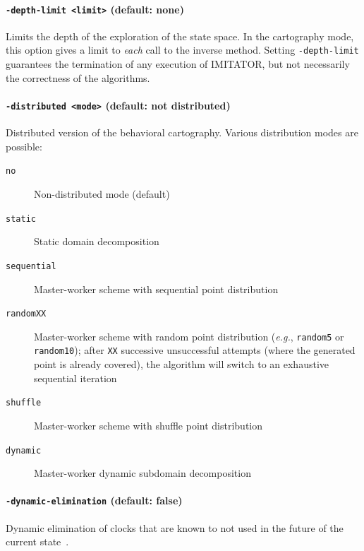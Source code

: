 \documentclass[a4paper,11pt]{report}
\newcommand{\imitator}{\textsf{IMITATOR}}
\newcommand{\styleOption}[1]{\textcolor{optioncolor}{\texttt{#1}}}
\newcommand{\eg}{\textcolor{colorok}{\textit{e.g.}, }}
\begin{document}
\paragraph{\styleOption{-depth-limit <limit>} (default: none)}
Limits the depth of the exploration of the state space.
In the cartography mode, this option gives a limit to \emph{each} call to the inverse method.
Setting \styleOption{-depth-limit} guarantees the termination of any execution of \imitator{}, but not necessarily the correctness of the algorithms.


\paragraph{\styleOption{-distributed <mode>} (default: not distributed)}
Distributed version of the behavioral cartography.
Various distribution modes are possible:

\begin{description}
	\item[\styleOption{no}] Non-distributed mode (default)
	\item[\styleOption{static}] Static domain decomposition \cite{ACN15}
	\item[\styleOption{sequential}] Master-worker scheme with sequential point distribution \cite{ACE14}
	\item[\styleOption{randomXX}] Master-worker scheme with random point distribution (\eg{} \styleOption{random5} or \styleOption{random10}); after \styleOption{XX} successive unsuccessful attempts (where the generated point is already covered), the algorithm will switch to an exhaustive sequential iteration \cite{ACE14}
	\item[\styleOption{shuffle}] Master-worker scheme with shuffle point distribution \cite{ACN15}
	\item[\styleOption{dynamic}] Master-worker dynamic subdomain decomposition \cite{ACN15}
\end{description}




\paragraph{\styleOption{-dynamic-elimination} (default: false)}
Dynamic elimination of clocks that are known to not used in the future of the current state~\cite{Andre13FSFMA}.
\end{document}
